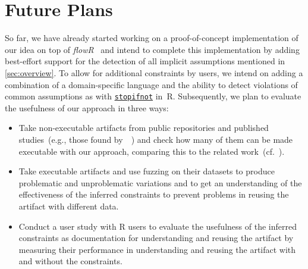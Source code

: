 \section{Future Plans}\label{sec:future-plans}
So far, we have already started working on a proof-of-concept implementation of our idea on top of \textit{flowR}~\cite{floopsla} and intend to complete this implementation by adding best-effort support for the detection of all implicit assumptions mentioned in \cref{sec:overview}.
To allow for additional constraints by users, we intend on adding a combination of a domain-specific language and the ability to detect violations of common assumptions as with \href{https://rdrr.io/r/base/stopifnot.html}{\texttt{stopifnot}} in~R. 
Subsequently, we plan to evaluate the usefulness of our approach in three ways:
\begin{itemize}[leftmargin=*,nosep]
   \item Take non-executable artifacts from public repositories and published studies~(e.g., those found by~\citeauthor{trisovic_largescale_2022}~\cite{trisovic_largescale_2022}) and check how many of them can be made executable with our approach, comparing this to the related work~(cf.~\cite{trisovic_largescale_2022,DBLP:conf/msr/IslamAW24,donat2025r4r}).
   \item Take executable artifacts and use fuzzing on their datasets to produce problematic and unproblematic variations and to get an understanding of the effectiveness of the inferred constraints to prevent problems in reusing the artifact with different data.
   \item Conduct a user study with R users to evaluate the usefulness of the inferred constraints as documentation for understanding and reusing the artifact by measuring their performance in understanding and reusing the artifact with and without the constraints.
\end{itemize}
